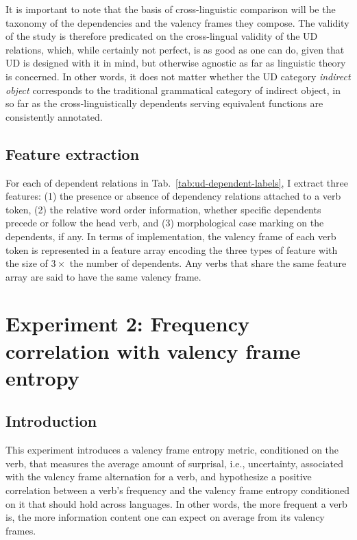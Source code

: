 It is important to note that the basis of cross-linguistic comparison will be the taxonomy of the dependencies and the valency frames they compose. The validity of the study is therefore predicated on the cross-lingual validity of the UD relations, which, while certainly not perfect, is as good as one can do, given that UD is designed with it in mind, but otherwise agnostic as far as linguistic theory is concerned. In other words, it does not matter whether the UD category \textit{indirect object} corresponds to the traditional grammatical category of indirect object, in so far as the cross-linguistically dependents serving equivalent functions are consistently annotated.

\subsection{Feature extraction}

For each of dependent relations in Tab.~\ref{tab:ud-dependent-labels}, I extract three features: (1) the presence or absence of dependency relations attached to a verb token, (2) the relative word order information, whether specific dependents precede or follow the head verb, and (3) morphological case marking on the dependents, if any. In terms of implementation, the valency frame of each verb token is represented in a feature array encoding the three types of feature with the size of $3\times$ the number of dependents. Any verbs that share the same feature array are said to have the same valency frame.

\section{Experiment 2: Frequency correlation with valency frame entropy}\label{sec:exp2-valency-frame-entropy}

\subsection{Introduction}
This experiment introduces a valency frame entropy metric, conditioned on the verb, that measures the average amount of surprisal, i.e., uncertainty, associated with the valency frame alternation for a verb, and hypothesize a positive correlation between a verb's frequency and the valency frame entropy conditioned on it that should hold across languages. In other words, the more frequent a verb is, the more information content one can expect on average from its valency frames.

